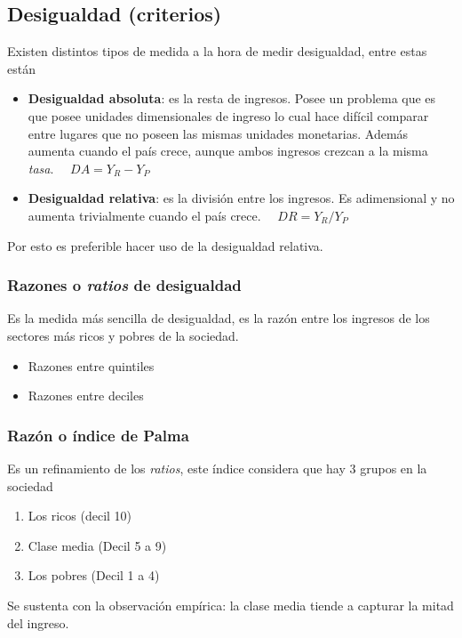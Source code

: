 \subsection{Desigualdad (criterios)}
Existen distintos tipos de medida a la hora de medir desigualdad, entre estas están

\begin{itemize}
    \item \textbf{Desigualdad absoluta}: es la resta de ingresos. Posee un problema que es que posee unidades dimensionales de ingreso lo cual hace difícil comparar entre lugares que no poseen las mismas unidades monetarias. Además aumenta cuando el país crece, aunque ambos ingresos crezcan a la misma \textit{tasa}. $\quad DA = Y_R - Y_P$
    
    \item \textbf{Desigualdad relativa}: es la división entre los ingresos. Es adimensional y no aumenta trivialmente cuando el país crece. $\quad DR = Y_R/Y_P$
\end{itemize}

Por esto es preferible hacer uso de la desigualdad relativa.

\subsubsection{Razones o \textit{ratios} de desigualdad}
Es la medida más sencilla de desigualdad, es la razón entre los ingresos de los sectores más ricos y pobres de la sociedad.

\begin{itemize}
    \item Razones entre quintiles
    \item Razones entre deciles
\end{itemize}

\subsubsection{Razón o índice de Palma}
Es un refinamiento de los \textit{ratios}, este índice considera que hay 3 grupos en la sociedad
\begin{enumerate}[label=\arabic*)]
    \item Los ricos (decil 10)
    \item Clase media (Decil 5 a 9)
    \item Los pobres (Decil 1 a 4)
\end{enumerate}

Se sustenta con la observación empírica: la clase media tiende a capturar la mitad del ingreso. 

